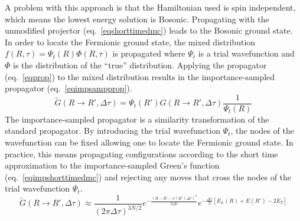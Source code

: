 A problem with this approach is that the Hamiltonian used is spin independent, which means the lowest energy solution is Bosonic.
Propagating with the unmodified projector (eq.~\ref{eqshorttimedmc}) leads to the Bosonic ground state.
In order to locate the Fermionic ground state, the mixed distribution $f(R,\tau) = \Psi_t(R)\Phi(R,\tau)$ is propagated where $\Psi_t$ is a trial wavefunction and $\Phi$ is the distribution of the ``true'' distribution.
Applying the propagator (eq.~\ref{eqprop}) to the mixed distribution results in the importance-sampled propagator (eq.~\ref{eqimpsampprop}). 
\begin{equation}
    \tilde{G}(R \rightarrow R', \Delta \tau)  = \Psi_t(R') G(R \rightarrow R', \Delta \tau) \frac{1}{\Psi_t(R)}
\label{eqimpsampprop}
\end{equation}
The importance-sampled propagator is a similarity transformation of the standard propagator.
By introducing the trial wavefunction $\Psi_t$, the nodes of the wavefunction can be fixed allowing one to locate the Fermionic ground state.
In practice, this means propagating configurations according to the short time approximation to the importance-sampled Green's function (eq.~\ref{eqimpshorttimedmc}) and rejecting any moves that cross the nodes of the trial wavefunction $\Psi_t$.
\begin{equation}
    \tilde{G}(R \rightarrow R', \Delta \tau) \approx \frac{1}{(2\pi\Delta\tau)^{3N/2}} e^{-\frac{(R - R' - v(R') \Delta \tau)^2 }{2\Delta\tau}} e^{-\frac{\Delta\tau}{2}[E_L(R) + E(R') - 2E_T]}
\label{eqimpshorttimedmc}
\end{equation}


